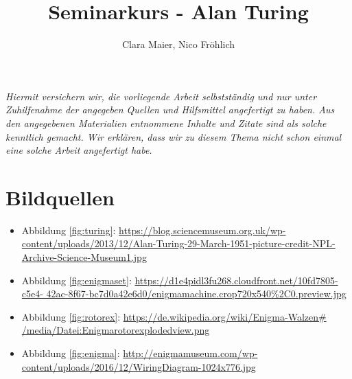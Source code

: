 \documentclass[11pt,a4paper]{article}
\author{Clara Maier, Nico Fröhlich}
\title{Seminarkurs - Alan Turing}
\renewcommand{\figurename}{Abbildung}
\newcommand{\picturesource}[2]{\item {\figurename} \ref{#1}: \href{#2}{#2}}
\begin{document}
\maketitle
\newpage
\emph{Hiermit versichern wir, die vorliegende Arbeit selbstständig und nur unter Zuhilfenahme der angegeben Quellen und Hilfsmittel angefertigt zu haben. Aus den angegebenen Materialien entnommene Inhalte und Zitate sind als solche kenntlich gemacht. Wir erklären, dass wir zu diesem Thema nicht schon einmal eine solche Arbeit angefertigt habe.}
\newpage

\tableofcontents
\newpage





\section*{Bildquellen}
{\renewcommand\labelitemi{}
\begin{itemize}
\picturesource{fig:turing}{https://blog.sciencemuseum.org.uk/wp-content/uploads/2013/12/Alan-Turing-29-March-1951-picture-credit-NPL-Archive-Science-Museum1.jpg}
\picturesource{fig:enigmaset}{https://d1e4pidl3fu268.cloudfront.net/10fd7805-c5e4-
42ac-8f67-bc7d0a42e6d0/enigma\textunderscore machine.crop\textunderscore 720x540\textunderscore 68\%2C0.preview.jpg}
\picturesource{fig:rotorex}{https://de.wikipedia.org/wiki/Enigma-Walzen\# /media/Datei:Enigma\textunderscore rotor\textunderscore exploded\textunderscore view.png}
\picturesource{fig:enigma}{http://enigmamuseum.com/wp-content/uploads/2016/12/WiringDiagram-1024x776.jpg}
\end{itemize}
}



\end{document}
